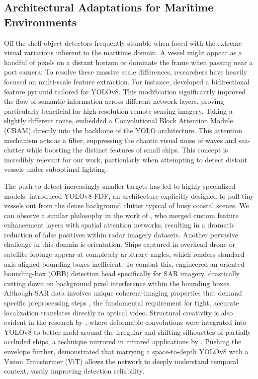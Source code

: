 \subsection{Architectural Adaptations for Maritime Environments}
Off-the-shelf object detectors frequently stumble when faced with the extreme visual variations inherent to the maritime domain. A vessel might appear as a handful of pixels on a distant horizon or dominate the frame when passing near a port camera. To resolve these massive scale differences, researchers have heavily focused on multi-scale feature extraction. For instance, \cite{Liu2025} developed a bidirectional feature pyramid tailored for YOLOv8. This modification significantly improved the flow of semantic information across different network layers, proving particularly beneficial for high-resolution remote sensing imagery. Taking a slightly different route, \cite{Shi2025} embedded a Convolutional Block Attention Module (CBAM) directly into the backbone of the YOLO architecture. This attention mechanism acts as a filter, suppressing the chaotic visual noise of waves and sea-clutter while boosting the distinct features of small ships. This concept is incredibly relevant for our work, particularly when attempting to detect distant vessels under suboptimal lighting.

The push to detect increasingly smaller targets has led to highly specialized models. \cite{Jiang2024} introduced YOLOv8-FDF, an architecture explicitly designed to pull tiny vessels out from the dense background clutter typical of busy coastal scenes. We can observe a similar philosophy in the work of \cite{Yang2024}, who merged custom feature enhancement layers with spatial attention networks, resulting in a dramatic reduction of false positives within radar imagery datasets. Another pervasive challenge in this domain is orientation. Ships captured in overhead drone or satellite footage appear at completely arbitrary angles, which renders standard axis-aligned bounding boxes inefficient. To combat this, \cite{Ning2024} engineered an oriented bounding-box (OBB) detection head specifically for SAR imagery, drastically cutting down on background pixel interference within the bounding boxes. Although SAR data involves unique coherent-imaging properties that demand specific preprocessing steps \cite{Yu2023}, the fundamental requirement for tight, accurate localization translates directly to optical video. Structural creativity is also evident in the research by \cite{Fu2025}, where deformable convolutions were integrated into YOLOv8 to better mold around the irregular and shifting silhouettes of partially occluded ships, a technique mirrored in infrared applications by \cite{Chen2024}. Pushing the envelope further, \cite{Wu2025} demonstrated that marrying a space-to-depth YOLOv8 with a Vision Transformer (ViT) allows the network to deeply understand temporal context, vastly improving detection reliability.

